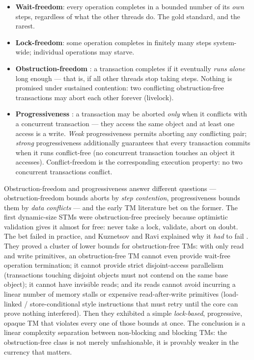 \begin{itemize}
\item \textbf{Wait-freedom}: every operation completes in a bounded number
of its \emph{own} steps, regardless of what the other threads do. The gold
standard, and the rarest.
\item \textbf{Lock-freedom}: some operation completes in finitely many
steps system-wide; individual operations may starve.
\item \textbf{Obstruction-freedom} \cite{herlihy03obstructionfree}: a
transaction completes if it eventually \emph{runs alone} long enough ---
that is, if all other threads stop taking steps. Nothing is promised under
sustained contention: two conflicting obstruction-free transactions may
abort each other forever (livelock).
\item \textbf{Progressiveness} \cite{guerraoui10principles}: a transaction
may be aborted \emph{only} when it conflicts with a concurrent
transaction --- they access the same object and at least one access is a
write. \emph{Weak} progressiveness permits aborting any conflicting pair;
\emph{strong} progressiveness additionally guarantees that every
transaction commits when it runs conflict-free (no concurrent transaction
touches an object it accesses). Conflict-freedom is the corresponding
execution property: no two concurrent transactions conflict.
\end{itemize}

Obstruction-freedom and progressiveness answer different questions ---
obstruction-freedom bounds aborts by \emph{step contention}, progressiveness
bounds them by \emph{data conflicts} --- and the early TM literature bet on
the former. The first dynamic-size STMs were obstruction-free precisely
because optimistic validation gives it almost for free: never take a lock,
validate, abort on doubt. The bet failed in practice, and
Kuznetsov and Ravi explained why it \emph{had} to fail
\cite{kuznetsov15obstructionfree}. They proved a cluster of lower bounds
for obstruction-free TMs: with only read and write primitives, an
obstruction-free TM cannot even provide wait-free operation termination;
it cannot provide strict disjoint-access parallelism (transactions touching
disjoint objects must not contend on the same base object); it cannot have
invisible reads; and its reads cannot avoid incurring a linear number of
memory stalls or expensive read-after-write primitives (load-linked /
store-conditional style instructions that must retry until the
core can prove nothing interfered). Then they
exhibited a simple \emph{lock-based}, progressive, opaque TM that violates
every one of those bounds at once. The conclusion is a linear complexity
separation between non-blocking and blocking TMs: the obstruction-free
class is not merely unfashionable, it is provably weaker in the currency
that matters.

